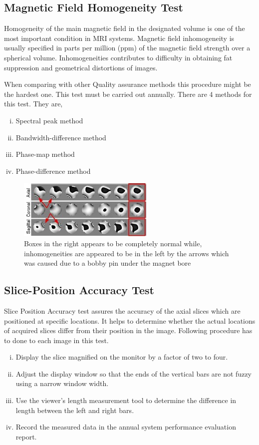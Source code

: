 \documentclass[12pt]{article}
\begin{document}
\subsection{Magnetic Field Homogeneity Test}
Homogeneity of the main magnetic field in the designated volume is one of the most important condition in MRI systems. Magnetic field inhomogeneity is usually specified in parts per million (ppm) of the magnetic field strength over a spherical volume. Inhomogeneities  contributes to difficulty in obtaining fat suppression and geometrical distortions of images. 

When comparing with other Quality assurance methods this procedure might be the hardest one. This test must be carried out annually. There are 4 methods for this test. They are,
\begin{enumerate}[i.]
    \item Spectral peak method
    \item Bandwidth-difference method
    \item Phase-map method
    \item Phase-difference method
\end{enumerate}
\begin{figure}[h!]
    \centering
    \includegraphics[width=0.5\linewidth]{ph6.jpg}
    \caption{\small{Boxes in the right appears to be completely normal while, inhomogeneities are appeared to be in the left by the arrows which was caused due to a bobby pin under the magnet bore}}
    \label{fig:The central portion of the SMPTE test pattern}
\end{figure}

\subsection{Slice-Position Accuracy Test}
Slice Position Accuracy test assures the accuracy of the axial slices which are positioned at specific locations. It helps to determine whether the actual locations of acquired slices differ from their position in the image. Following procedure has to done to each image in this test.
\begin{enumerate}[i.]
    \item Display the slice magnified on the monitor by a factor of two to four.
    \item Adjust the display window so that the ends of the vertical bars are not fuzzy using a narrow window width.
    \item Use the viewer’s length measurement tool to determine the difference in length between the left and right bars.
    \item Record the measured data in the annual system performance evaluation report.
\end{enumerate}
\end{document}

